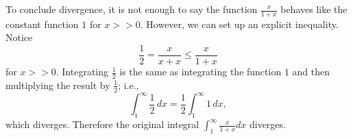 \documentclass[11pt,letterpaper]{article}
\begin{document}
\begin{enumerate}
\begin{enumerate}
To conclude divergence, it is not enough to say the function $\frac{x}{1+x}$ behaves like the constant function $1$ for $x>>0$.  However, we can set up an explicit inequality.  Notice
\[\frac{1}{2}=\frac{x}{x+x}\leq\frac{x}{1+x}\]
for $x>>0$.  Integrating $\frac{1}{2}$ is the same as integrating the function $1$ and then multiplying the result by $\frac{1}{2}$; i.e., 
\[\int_1^{\infty}\frac{1}{2}\,dx=\frac{1}{2}\int_1^{\infty}1\,dx,\]
which diverges.  Therefore the original integral $\int_1^{\infty}\frac{x}{1+x}dx$ diverges.
\end{enumerate}

\end{enumerate}
\end{document}
